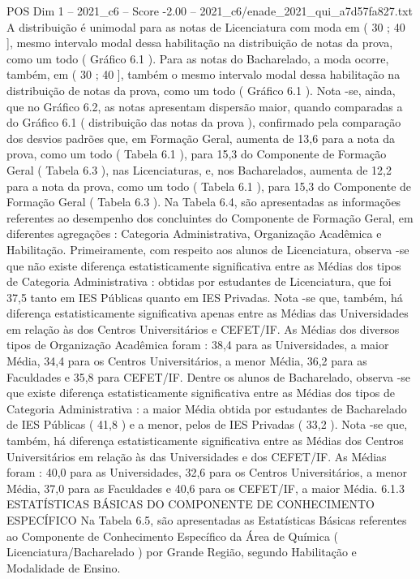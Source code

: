 \begin{textsample}{POS Dim 1 – 2021\_c6 – Score -2.00 – 2021\_c6/enade\_2021\_qui\_a7d57fa827.txt}
A distribuição é unimodal para as notas de Licenciatura com moda em ( 30 ; 40 ], mesmo intervalo modal dessa habilitação na distribuição de notas da prova, como um todo ( Gráfico 6.1 ).
Para as notas do Bacharelado, a moda ocorre, também, em ( 30 ; 40 ], também o mesmo intervalo modal dessa habilitação na distribuição de notas da prova, como um todo ( Gráfico 6.1 ).
Nota -se, ainda, que no Gráfico 6.2, as notas apresentam dispersão maior, quando comparadas a do Gráfico 6.1 ( distribuição das notas da prova ), confirmado pela comparação dos desvios padrões que, em Formação Geral, aumenta de 13,6 para a nota da prova, como um todo ( Tabela 6.1 ), para 15,3 do Componente de Formação Geral ( Tabela 6.3 ), nas Licenciaturas, e, nos Bacharelados, aumenta de 12,2 para a nota da prova, como um todo ( Tabela 6.1 ), para 15,3 do Componente de Formação Geral ( Tabela 6.3 ).
Na Tabela 6.4, são apresentadas as informações referentes ao desempenho dos concluintes do Componente de Formação Geral, em diferentes agregações : Categoria Administrativa, Organização Acadêmica e Habilitação.
Primeiramente, com respeito aos alunos de Licenciatura, observa -se que não existe diferença estatisticamente significativa entre as Médias dos tipos de Categoria Administrativa : obtidas por estudantes de Licenciatura, que foi 37,5 tanto em IES Públicas quanto em IES Privadas.
Nota -se que, também, há diferença estatisticamente significativa apenas entre as Médias das Universidades em relação às dos Centros Universitários e CEFET/IF.
As Médias dos diversos tipos de Organização Acadêmica foram : 38,4 para as Universidades, a maior Média, 34,4 para os Centros Universitários, a menor Média, 36,2 para as Faculdades e 35,8 para CEFET/IF.
Dentre os alunos de Bacharelado, observa -se que existe diferença estatisticamente significativa entre as Médias dos tipos de Categoria Administrativa : a maior Média obtida por estudantes de Bacharelado de IES Públicas ( 41,8 ) e a menor, pelos de IES Privadas ( 33,2 ).
Nota -se que, também, há diferença estatisticamente significativa entre as Médias dos Centros Universitários em relação às das Universidades e dos CEFET/IF.
As Médias foram : 40,0 para as Universidades, 32,6 para os Centros Universitários, a menor Média, 37,0 para as Faculdades e 40,6 para os CEFET/IF, a maior Média. 6.1.3 ESTATÍSTICAS BÁSICAS DO COMPONENTE DE CONHECIMENTO ESPECÍFICO Na Tabela 6.5, são apresentadas as Estatísticas Básicas referentes ao Componente de Conhecimento Específico da Área de Química ( Licenciatura/Bacharelado ) por Grande Região, segundo Habilitação e Modalidade de Ensino.

\end{textsample}
